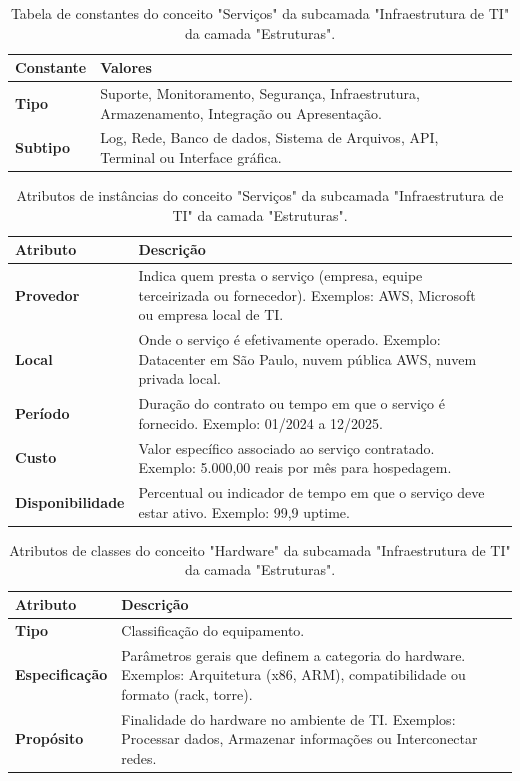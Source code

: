 \begin{apendicesenv}
\begin{table}[H]
\centering
\caption{Tabela de constantes do conceito "Serviços" da subcamada "Infraestrutura de TI" da camada "Estruturas".}
\begin{tabularx}{\textwidth}{|l|X|X|}
\hline
\textbf{Constante} & \textbf{Valores} \\ \hline
\textbf{Tipo}  & Suporte, Monitoramento, Segurança, Infraestrutura, Armazenamento, Integração ou Apresentação.  \\ \hline
\textbf{Subtipo} & Log, Rede, Banco de dados, Sistema de Arquivos, API, Terminal ou Interface gráfica.  \\ \hline
\end{tabularx}
\end{table}

\begin{table}[H]
\centering
\caption{Atributos de instâncias do conceito "Serviços" da subcamada "Infraestrutura de TI" da camada "Estruturas".}
\begin{tabularx}{\textwidth}{|l|X|X|}
\hline
\textbf{Atributo} & \textbf{Descrição} \\ \hline
\textbf{Provedor} & Indica quem presta o serviço (empresa, equipe terceirizada ou fornecedor). Exemplos: AWS, Microsoft ou empresa local de TI. \\ \hline
\textbf{Local} & Onde o serviço é efetivamente operado. Exemplo: Datacenter em São Paulo, nuvem pública AWS, nuvem privada local. \\ \hline
\textbf{Período} & Duração do contrato ou tempo em que o serviço é fornecido. Exemplo: 01/2024 a 12/2025. \\ \hline
\textbf{Custo} & Valor específico associado ao serviço contratado. Exemplo: 5.000,00 reais por mês para hospedagem. \\ \hline
\textbf{Disponibilidade} & Percentual ou indicador de tempo em que o serviço deve estar ativo. Exemplo: 99,9 uptime. \\ \hline
\end{tabularx}
\end{table}

\begin{table}[H]
\centering
\caption{Atributos de classes do conceito "Hardware" da subcamada "Infraestrutura de TI" da camada "Estruturas".}
\begin{tabularx}{\textwidth}{|l|X|X|}
\hline
\textbf{Atributo} & \textbf{Descrição} \\ \hline
\textbf{Tipo}  & Classificação do equipamento.\\ \hline
\textbf{Especificação} & Parâmetros gerais que definem a categoria do hardware. Exemplos: Arquitetura (x86, ARM), compatibilidade ou formato (rack, torre). \\ \hline
\textbf{Propósito} & Finalidade do hardware no ambiente de TI. Exemplos: Processar dados, Armazenar informações ou Interconectar redes. \\ \hline
\end{tabularx}
\end{table}


\end{apendicesenv}
